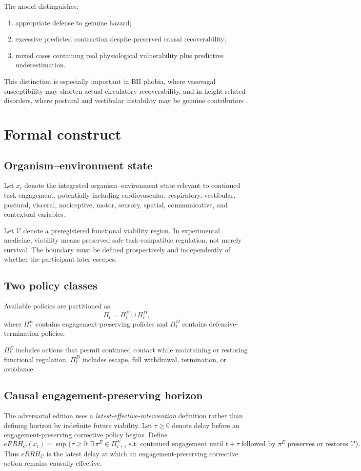 \documentclass[9pt,twocolumn]{article}
\begin{document}
The model distinguishes:
\begin{enumerate}
\item appropriate defense to genuine hazard;
\item excessive predicted contraction despite preserved causal recoverability;
\item mixed cases containing real physiological vulnerability plus predictive underestimation.
\end{enumerate}

This distinction is especially important in BII phobia, where vasovagal susceptibility may shorten actual circulatory recoverability, and in height-related disorders, where postural and vestibular instability may be genuine contributors \cite{ayala2009,ritz2010,huppert2020}.

\section{Formal construct}
\subsection{Organism--environment state}
Let $x_t$ denote the integrated organism--environment state relevant to continued task engagement, potentially including cardiovascular, respiratory, vestibular, postural, visceral, nociceptive, motor, sensory, spatial, communicative, and contextual variables.

Let $\mathcal V$ denote a preregistered functional viability region. In experimental medicine, viability means preserved safe task-compatible regulation, not merely survival. The boundary must be defined prospectively and independently of whether the participant later escapes.

\subsection{Two policy classes}
Available policies are partitioned as
\[
\Pi_t=\Pi_t^E\cup\Pi_t^D,
\]
where $\Pi_t^E$ contains engagement-preserving policies and $\Pi_t^D$ contains defensive-termination policies.

$\Pi_t^E$ includes actions that permit continued contact while maintaining or restoring functional regulation. $\Pi_t^D$ includes escape, full withdrawal, termination, or avoidance.

\subsection{Causal engagement-preserving horizon}
The adversarial edition uses a \emph{latest-effective-intervention} definition rather than defining horizon by indefinite future viability. Let $\tau\ge0$ denote delay before an engagement-preserving corrective policy begins. Define
\[
 eRRH_C(x_t)=\sup\Big\{\tau\ge0:\exists\,\pi^E\in\Pi^E_{t+\tau}
\;\text{s.t. continued engagement until }t+\tau
\;\text{followed by }\pi^E
\;\text{preserves or restores }\mathcal V\Big\}.
\]
Thus $eRRH_C$ is the latest delay at which an engagement-preserving corrective action remains causally effective.
\end{document}
